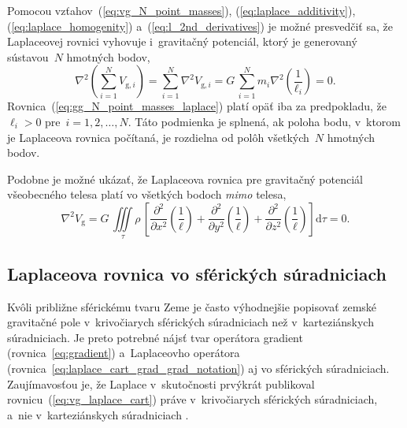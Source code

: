\documentclass[a4paper, 12pt]{book}
\newcommand{\diff}{\mathrm d}
\newcommand{\gidx}{\mathrm g}
\begin{document}
Pomocou vzťahov~(\ref{eq:vg_N_point_masses}), (\ref{eq:laplace_additivity}), 
(\ref{eq:laplace_homogenity}) a~(\ref{eq:l_2nd_derivatives}) je možné 
presvedčiť sa, že Laplaceovej rovnici vyhovuje i~gravitačný potenciál, ktorý je 
generovaný sústavou~$N$ hmotných bodov,
%
\begin{equation}
\label{eq:gg_N_point_masses_laplace}
\nabla^2 \left( \sum_{i = 1}^N V_{\gidx,i} \right) = \sum_{i = 1}^N \nabla^2
V_{\gidx,i} = G \, \sum_{i = 1}^N m_i \nabla^2 \left( \frac{1}{\ell_i} \right) 
= 0{.}
\end{equation}
%
Rovnica~(\ref{eq:gg_N_point_masses_laplace}) platí opäť iba za predpokladu, 
že~$\ell_i > 0$ pre~$i = 1, 2, \dots, N$.  Táto podmienka je splnená, ak poloha 
bodu, v~ktorom je Laplaceova rovnica počítaná, je rozdielna od polôh 
všetkých~$N$ hmotných bodov.

Podobne je možné ukázať, že Laplaceova rovnica pre gravitačný potenciál 
všeobecného telesa platí vo všetkých bodoch \emph{mimo} telesa,
%
\begin{equation}
\nabla^2 V_\gidx = G\, \iiint\limits_\tau \rho \, \left[ 
\frac{\partial^2}{\partial
x^2}\left(\frac{1}{\ell}\right) + \frac{\partial^2}{\partial
y^2}\left(\frac{1}{\ell}\right) + \frac{\partial^2}{\partial
z^2}\left(\frac{1}{\ell}\right) \right] \diff\tau = 0{.}
\end{equation}


\subsection{Laplaceova rovnica vo sférických súradniciach}
\label{sec:laplace_equation_sph}

Kvôli približne sférickému tvaru Zeme je často výhodnejšie popisovať zemské 
gravitačné pole v~krivočiarych sférických súradniciach než v~karteziánskych 
súradniciach.  Je preto potrebné nájsť tvar operátora gradient 
(rovnica~\ref{eq:gradient}) a~Laplaceovho operátora 
(rovnica~\ref{eq:laplace_cart_grad_grad_notation}) aj vo sférických 
súradniciach.  Zaujímavosťou je, že Laplace v~skutočnosti prvýkrát publikoval 
rovnicu~(\ref{eq:vg_laplace_cart}) práve v~krivočiarych sférických 
súradniciach, a~nie v~karteziánskych súradniciach \parencite{MacMillan1930}.
\end{document}
